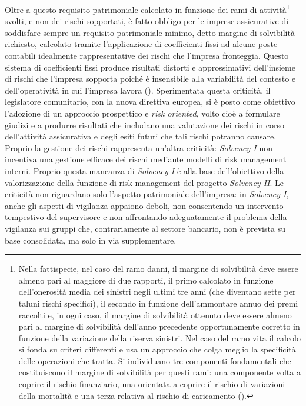 Oltre a questo requisito patrimoniale calcolato in funzione dei rami di attività\footnote{Nella fattispecie, nel caso del ramo danni, il margine di solvibilità deve essere almeno pari al maggiore di due rapporti, il primo calcolato in funzione dell’onerosità media dei sinistri negli ultimi tre anni (che diventano sette per taluni rischi specifici), il secondo in funzione dell’ammontare annuo dei premi raccolti e, in ogni caso, il margine di solvibilità ottenuto deve essere almeno pari al margine di solvibilità dell’anno precedente opportunamente corretto in funzione della variazione della riserva sinistri.
Nel caso del ramo vita il calcolo si fonda su criteri differenti e usa un approccio che colga meglio la specificità delle operazioni che tratta. Si individuano tre componenti fondamentali che costituiscono il margine di solvibilità per questi rami: una componente volta a coprire il rischio finanziario, una orientata a coprire il rischio di variazioni della mortalità e una terza relativa al rischio di caricamento (\cite[pp. 181-191]{cappiellogestione}).} svolti, e non dei rischi sopportati, è fatto obbligo per le imprese assicurative di soddisfare sempre un requisito patrimoniale minimo, detto margine di solvibilità richiesto, calcolato tramite l’applicazione di coefficienti fissi ad alcune poste contabili idealmente rappresentative dei rischi che l’impresa fronteggia. Questo sistema di coefficienti fissi produce risultati distorti e approssimativi dell’insieme di rischi che l’impresa sopporta poiché è insensibile alla variabilità del contesto e dell’operatività in cui l’impresa lavora (\cite[p. 8]{pacievoluzione}).
Sperimentata questa criticità, il legislatore comunitario, con la nuova direttiva europea, si è posto come obiettivo l’adozione di un approccio prospettico e \textit{risk oriented}, volto cioè a formulare giudizi e a produrre risultati che includano una valutazione dei rischi in corso dell’attività assicurativa e degli esiti futuri che tali rischi potranno causare.
Proprio la gestione dei rischi rappresenta un’altra criticità: \textit{Solvency I} non incentiva una gestione efficace dei rischi mediante modelli di risk management interni. Proprio questa mancanza di \textit{Solvency I} è alla base dell’obiettivo della valorizzazione della funzione di risk management del progetto \textit{\textit{Solvency I}I}.
Le criticità non riguardano solo l’aspetto patrimoniale dell’impresa: in \textit{Solvency I}, anche gli aspetti di vigilanza appaiono deboli, non consentendo un intervento tempestivo del supervisore e non affrontando adeguatamente il problema della vigilanza sui gruppi che, contrariamente al settore bancario, non è prevista su base consolidata, ma solo in via supplementare.

